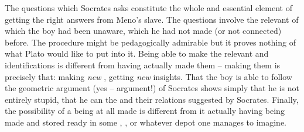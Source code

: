 The questions which Socrates asks constitute the whole and essential element of
getting the right answers from Meno's slave.  The questions involve the relevant
 of which the boy had been unaware, which he had not made
(or not connected) before.  The procedure might be pedagogically admirable but
it proves nothing of 
what Plato would like to put into it.  Being able to make the relevant
 and identifications is different from having actually made
them -- making them is precisely that: making {\em new} ,
getting {\em new} insights.  That
the boy is able to follow the geometric argument (yes -- argument!)  of Socrates
shows simply that he is not entirely stupid, that he can  the
 and their relations suggested by Socrates. Finally, the
possibility of a 
 being at all made is different from it actually having being
made and stored ready in some , , or
whatever depot one manages to imagine.


